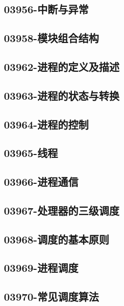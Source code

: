 \subsection{03956-中断与异常}

\subsection{03958-模块组合结构}

\subsection{03962-进程的定义及描述}

\subsection{03963-进程的状态与转换}

\subsection{03964-进程的控制}

\subsection{03965-线程}

\subsection{03966-进程通信}

\subsection{03967-处理器的三级调度}

\subsection{03968-调度的基本原则}

\subsection{03969-进程调度}

\subsection{03970-常见调度算法}

